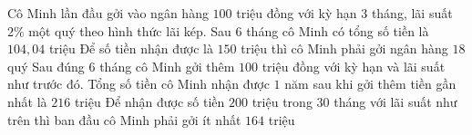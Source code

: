\begin{ex}%
 Cô Minh lần đầu gởi vào ngân hàng $100$ triệu đồng với kỳ hạn $3$ tháng,  lãi suất $2\%$ một quý theo hình thức lãi kép.
  \choiceTF
  {\True Sau $6$ tháng cô Minh  có tổng số tiền là $104{,}04$ triệu}
   {Để số tiền nhận được là $150$ triệu thì cô Minh phải gởi ngân hàng $18$ quý}
  {Sau đúng $6$ tháng cô Minh gởi thêm $100$ triệu đồng với kỳ hạn và lãi suất  như trước đó. Tổng số tiền cô Minh nhận được $1$ năm sau khi gởi thêm tiền gần nhất là $216$ triệu}
  {Để nhận được số tiền $200$ triệu trong 30 tháng với lãi suất như trên thì ban đầu cô Minh phải gởi ít  nhất $164$ triệu}
\end{ex}

